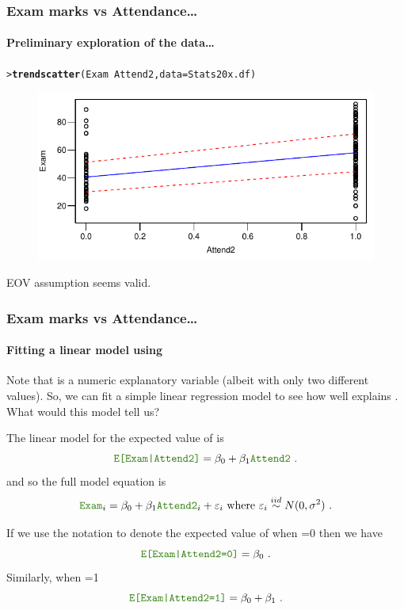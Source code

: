 \documentclass{beamer}\usepackage[]{graphicx}\usepackage[]{xcolor}
\makeatletter
\newcommand{\hlopt}[1]{\textcolor[rgb]{0,0,0}{#1}}%
\newcommand{\hlstd}[1]{\textcolor[rgb]{0.345,0.345,0.345}{#1}}%
\newcommand{\hlkwc}[1]{\textcolor[rgb]{0.333,0.667,0.333}{#1}}%
\newcommand{\hlkwd}[1]{\textcolor[rgb]{0.737,0.353,0.396}{\textbf{#1}}}%
\newenvironment{kframe}{%
 \def\at@end@of@kframe{}%
 \ifinner\ifhmode%
  \def\at@end@of@kframe{\end{minipage}}%
  \begin{minipage}{\columnwidth}%
 \fi\fi%
 \def\FrameCommand##1{\hskip\@totalleftmargin \hskip-\fboxsep
 \colorbox{shadecolor}{##1}\hskip-\fboxsep
     \hskip-\linewidth \hskip-\@totalleftmargin \hskip\columnwidth}%
 \MakeFramed {\advance\hsize-\width
   \@totalleftmargin\z@ \linewidth\hsize
   \@setminipage}}%
 {\par\unskip\endMakeFramed%
 \at@end@of@kframe}
\newenvironment{knitrout}{}{} %
\makeatother
\begin{document}
\begin{frame}[fragile]
\frametitle{Exam marks vs Attendance\ldots}
\framesubtitle{Preliminary exploration of the data\ldots}
 \bigskip

\begin{knitrout}\scriptsize
{}\color{fgcolor}\begin{kframe}
\begin{alltt}
\hlstd{> }\hlkwd{trendscatter}\hlstd{(Exam}\hlopt{~} \hlstd{Attend2,} \hlkwc{data} \hlstd{= Stats20x.df)}
\end{alltt}
\end{kframe}
\end{knitrout}



\begin{figure}
  \centering
  \includegraphics{figure/RC-H05-006}
\end{figure}

EOV assumption seems valid. 

\end{frame}


\begin{frame}[fragile]
\frametitle{Exam marks vs Attendance\ldots}
\framesubtitle{Fitting a linear model using }
Note that  is a numeric explanatory variable (albeit with only two different values). So, we can fit a simple linear regression model to see how well  explains . What would this model tell us?
\medskip

The linear model for the expected value of  is
\[
\rcode{E[Exam|Attend2]}=\beta_0+\beta_1 \rcode{Attend2} \ .
\]
and so the full model equation is
\[
\rcode{Exam}_i=\beta_0+\beta_1 \rcode{Attend2}_i+\varepsilon_i \text{~where~} \varepsilon_i \iid N(0, \sigma^2) \ .
\]

If we use the notation  to denote the expected value of  when =0 then we have
\[
\rcode{E[Exam|Attend2=0]}=\beta_0 \ .
\]
Similarly, when =1
\[
\rcode{E[Exam|Attend2=1]}=\beta_0 + \beta_1\ .
\]


\end{frame}
\end{document}
